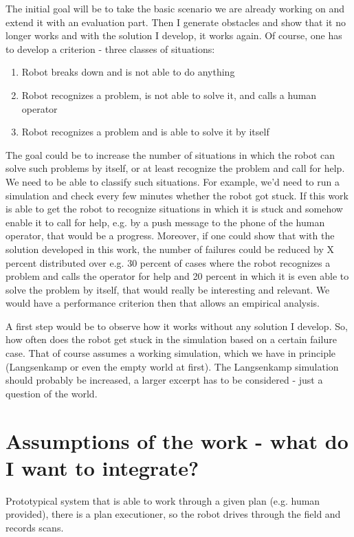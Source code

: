 \documentclass[german, master, expose, latin1]{base/thesis_KBS}
\begin{document}
The initial goal will be to take the basic scenario we are already working on and extend it with an evaluation part. Then I generate obstacles and show that it no
longer works and with the solution I develop, it works again. Of course, one has to develop a criterion - three classes of situations:
\begin{enumerate}
    \item Robot breaks down and is not able to do anything
    \item Robot recognizes a problem, is not able to solve it, and calls a human operator
    \item Robot recognizes a problem and is able to solve it by itself
\end{enumerate}

The goal could be to increase the number of situations in which the robot can solve such problems by itself, or at least recognize the problem and call for help.
We need to be able to classify such situations. For example, we'd need to run a simulation and check every few minutes whether the robot got stuck.
If this work is able to get the robot to recognize situations in which it is stuck and somehow enable it to call for help, e.g. by a push message to
the phone of the human operator, that would be a progress. Moreover, if one could show that with the solution developed in this work, the number of failures
could be reduced by X percent distributed over e.g. 30 percent of cases where the robot recognizes a problem and calls the operator for help and 20 percent in which
it is even able to solve the problem by itself, that would really be interesting and relevant. We would have a performance criterion then that allows 
an empirical analysis.\newline

A first step would be to observe how it works without any solution I develop. So, how often does the robot get stuck in the simulation based on a certain failure
case. That of course assumes a working simulation, which we have in principle (Langsenkamp or even the empty world at first). The Langsenkamp simulation should
probably be increased, a larger excerpt has to be considered - just a question of the world.

\section{Assumptions of the work - what do I want to integrate?}

Prototypical system that is able to work through a given plan (e.g. human provided), there is a plan executioner, so the robot drives through the field and records scans.\newline
\end{document}
